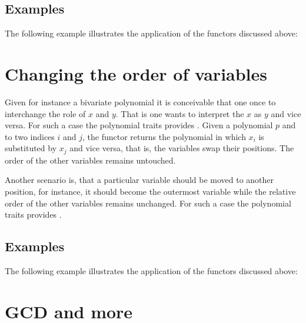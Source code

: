 \subsection{Examples}
The following example illustrates the application of the functors discussed above:

\section{Changing the order of variables}

Given for instance a bivariate polynomial it is conceivable that one once to 
interchange the role of $x$ and $y$. That is one wants to interpret the $x$ as $y$ 
and vice versa. For such a case the polynomial traits provides . 
Given a polynomial $p$ and to two indices $i$ and $j$, the functor returns the polynomial 
in which $x_i$ is substituted by $x_j$ and vice versa, that is, the variables swap their positions.
The order of the other variables remains untouched. 

Another scenario is, that a particular variable should be moved to another position, 
for instance, it should become the 
outermost variable while the relative order of the other variables remains unchanged. 
For such a case the polynomial traits provides .

\subsection{Examples}
The following example illustrates the application of the functors discussed above:


\section{GCD and more}

